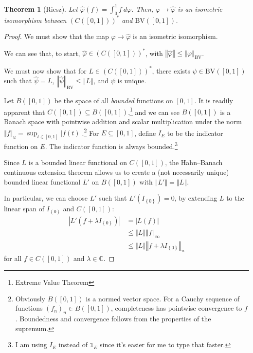 \documentclass[10pt]{extarticle}
\newcommand{\C}{\mathbb{C}}
\newcommand{\norm}[1]{\left\Vert #1\right\Vert}
\newcommand{\set}[1]{\left\{#1\right\}}
\theoremstyle{plain}
\newtheorem*{theorem}{Theorem}
\theoremstyle{definition}
\theoremstyle{note}
\renewcommand{\newline}{\hfill\break}
\begin{document}
\begin{theorem}[Riesz]
  Let $\hat{\varphi}(f) = \int_{0}^{1}f\:d\varphi$. Then, $\varphi \rightarrow \hat{\varphi}$ is an isometric isomorphism between $\left(C\left([0,1]\right)\right)^{\ast}$ and $\text{BV}\left([0,1]\right)$.
\end{theorem}
\begin{proof}
  We must show that the map $\varphi\mapsto \hat\varphi$ is an isometric isomorphism.\newline

  We can see that, to start, $\hat\varphi \in \left(C\left([0,1]\right)\right)^{\ast}$, with $\norm{\hat{\varphi}} \leq \norm{\varphi}_{\text{BV}}$.\newline

  We must now show that for $L\in \left(C\left([0,1]\right)\right)^{\ast}$, there exists $\psi \in \text{BV}\left([0,1]\right)$ such that $\hat{\psi} = L$, $\norm{\hat{\psi}}_{\text{BV}} \leq \norm{L}$, and $\psi$ is unique.\newline

  Let $B([0,1])$ be the space of all \textit{bounded} functions on $[0,1]$. It is readily apparent that $C([0,1])\subseteq B([0,1])$,\footnote{Extreme Value Theorem} and we can see $B([0,1])$ is a Banach space with pointwise addition and scalar multiplication under the norm $\norm{f}_{u} = \sup_{t\in [0,1]}\left\vert f(t) \right\vert$.\footnote{Obviously $B([0,1])$ is a normed vector space. For a Cauchy sequence of functions $(f_n)_n\in B([0,1])$, completeness has pointwise convergence to $f$. Boundedness and convergence follows from the properties of the supremum.} For $E\subseteq [0,1]$, define $I_{E}$ to be the indicator function on $E$. The indicator function is always bounded.\footnote{I am using $I_E$ instead of $\mathbb{1}_{E}$ since it's easier for me to type that faster.}\newline

  Since $L$ is a bounded linear functional on $C([0,1])$, the Hahn--Banach continuous extension theorem allows us to create a (not necessarily unique) bounded linear functional $L'$ on $B([0,1])$ with $\norm{L'} = \norm{L}$.\newline

  In particular, we can choose $L'$ such that $L'\left(I_{\set{0}}\right) = 0$, by extending $L$ to the linear span of $I_{\set{0}}$ and $C([0,1])$:
  \begin{align*}
    \left\vert L'\left(f + \lambda I_{\set{0}}\right) \right\vert &= \left\vert L(f) \right\vert\\
                                                                  &\leq \norm{L}\norm{f}_{\infty}\\
                                                                  &\leq \norm{L}\norm{f + \lambda I_{\set{0}}}_{u}
  \end{align*}
  for all $f\in C([0,1])$ and $\lambda \in \C$.\newline


\end{proof}
\end{document}

